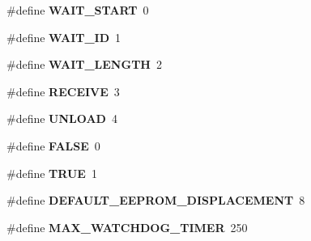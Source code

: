 \begin{DoxyCompactItemize}
\#define {\bfseries W\+A\+I\+T\+\_\+\+S\+T\+A\+RT}~0
\item 
\mbox{\label{globals_8h_a6a6a0bb02e515a094c3e7ea1bcb66fcc}} 
\#define {\bfseries W\+A\+I\+T\+\_\+\+ID}~1
\item 
\mbox{\label{globals_8h_a235d2d0eac7e9af190ebafb84df37fd9}} 
\#define {\bfseries W\+A\+I\+T\+\_\+\+L\+E\+N\+G\+TH}~2
\item 
\mbox{\label{globals_8h_a3b4d8a5e259fa47a909adefcda3bfb80}} 
\#define {\bfseries R\+E\+C\+E\+I\+VE}~3
\item 
\mbox{\label{globals_8h_abf4aedd34d31b63b63061c975d872580}} 
\#define {\bfseries U\+N\+L\+O\+AD}~4
\item 
\mbox{\label{globals_8h_aa93f0eb578d23995850d61f7d61c55c1}} 
\#define {\bfseries F\+A\+L\+SE}~0
\item 
\mbox{\label{globals_8h_aa8cecfc5c5c054d2875c03e77b7be15d}} 
\#define {\bfseries T\+R\+UE}~1
\item 
\mbox{\label{globals_8h_a0f5a7e2ead9cd507bf8fc9a6f785f012}} 
\#define {\bfseries D\+E\+F\+A\+U\+L\+T\+\_\+\+E\+E\+P\+R\+O\+M\+\_\+\+D\+I\+S\+P\+L\+A\+C\+E\+M\+E\+NT}~8
\item 
\mbox{\label{globals_8h_a887dbd571d7f138cbe0e994e3fcc661b}} 
\#define {\bfseries M\+A\+X\+\_\+\+W\+A\+T\+C\+H\+D\+O\+G\+\_\+\+T\+I\+M\+ER}~250
\end{DoxyCompactItemize}
